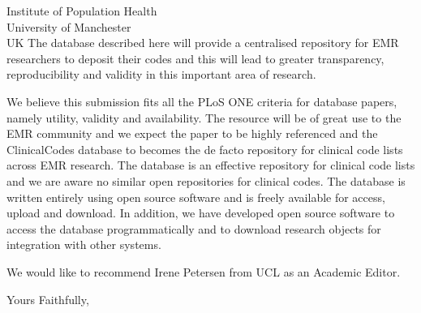 \documentclass{letter}
\begin{document}
\begin{letter}{Institute of Population Health \\ University of Manchester \\ UK}
The database described here will provide a centralised repository for EMR researchers to deposit their codes and this will lead to greater transparency, reproducibility and validity in this important area of research.

We believe this submission fits all the PLoS ONE criteria for database papers, namely utility, validity and availability. The resource will be of great use to the EMR community and we expect the paper to be highly referenced and the ClinicalCodes database to becomes the de facto repository for clinical code lists across EMR research. The database is an effective repository for clinical code lists and we are aware no similar open repositories for clinical codes.  The database is written entirely using open source software and is freely available for access, upload and download.  In addition, we have developed open source software to access the database programmatically and to download research objects for integration with other systems.

We would like to recommend Irene Petersen from UCL as an Academic Editor.

\closing{Yours Faithfully,}
\end{letter}
\end{document}
